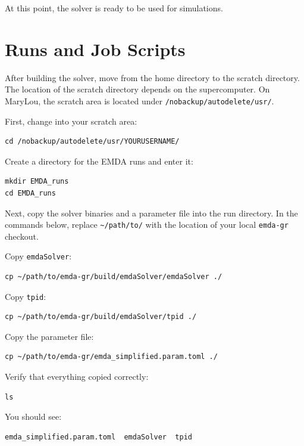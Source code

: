 At this point, the solver is ready to be used for simulations.

\section{Runs and Job Scripts}

After building the solver, move from the home directory to the scratch directory.
The location of the scratch directory depends on the supercomputer. On MaryLou,
the scratch area is located under \texttt{/nobackup/autodelete/usr/}.

First, change into your scratch area:

\begin{verbatim}
cd /nobackup/autodelete/usr/YOURUSERNAME/
\end{verbatim}

Create a directory for the EMDA runs and enter it:

\begin{verbatim}
mkdir EMDA_runs
cd EMDA_runs
\end{verbatim}

Next, copy the solver binaries and a parameter file into the run directory. In
the commands below, replace \texttt{\textasciitilde/path/to/} with the location
of your local \texttt{emda-gr} checkout.

Copy \texttt{emdaSolver}:

\begin{verbatim}
cp ~/path/to/emda-gr/build/emdaSolver/emdaSolver ./
\end{verbatim}

Copy \texttt{tpid}:

\begin{verbatim}
cp ~/path/to/emda-gr/build/emdaSolver/tpid ./
\end{verbatim}

Copy the parameter file:

\begin{verbatim}
cp ~/path/to/emda-gr/emda_simplified.param.toml ./
\end{verbatim}

Verify that everything copied correctly:

\begin{verbatim}
ls
\end{verbatim}

You should see:

\begin{verbatim}
emda_simplified.param.toml  emdaSolver  tpid
\end{verbatim}

